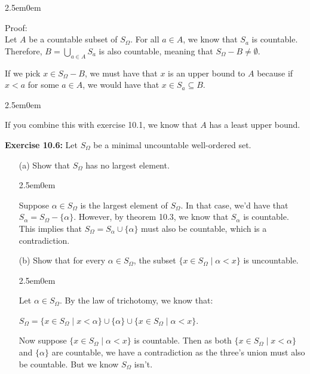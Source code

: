 \documentclass{book}
\newcommand{\hTwo}{%
\color{Black}%
   \fontsize{13}{15}\selectfont%
}
\newcommand{\myComment}{%
   \color{RawerSienna}%
   \fontsize{12}{14}\selectfont%
}
\newcommand{\exOne}{%
   \color{Purple}%
   \fontsize{14}{16}\selectfont%
}
\newcommand{\exTwo}{%
\color{Purple}%
   \fontsize{13}{15}\selectfont%
}
\newenvironment{myIndent}{%
   \begin{adjustwidth}{2.5em}{0em}%
}{%
   \end{adjustwidth}%
}
\newcommand{\blab}[1]{\textbf{#1}}
\newcommand{\retTwo}{\hfill\bigbreak}
\begin{document}
   \begin{myIndent}\hTwo
      Proof:\\
      Let $A$ be a countable subset of $S_\Omega$. For all $a \in A$, we know that $S_a$ is countable. Therefore, $B = \bigcup\limits_{a \in A}S_a$ is also countable, meaning that $S_\Omega - B \neq \emptyset$.\retTwo

      If we pick $x \in S_\Omega - B$, we must have that $x$ is an upper bound to $A$ because if $x < a$ for some $a \in A$, we would have that $x \in S_a \subseteq B$.\retTwo
      
      
      \begin{myIndent}\myComment
         If you combine this with exercise 10.1, we know that $A$ has a least upper bound.\retTwo
      \end{myIndent}
   \end{myIndent}

   \exOne
   \blab{Exercise 10.6:} Let $S_\Omega$ be a minimal uncountable well-ordered set.
   
   \begin{itemize}
      \item[(a)] Show that $S_\Omega$ has no largest element.
      \begin{myIndent}\exTwo
         Suppose $\alpha \in S_\Omega$ is the largest element of $S_\Omega$. In that case, we'd have that\\ $S_\alpha = S_\Omega - \{\alpha\}$. However, by theorem 10.3, we know that $S_\alpha$ is countable. This implies that $S_\Omega = S_\alpha \cup \{\alpha\}$ must also be countable, which is a contradiction.
         \retTwo
      \end{myIndent}
      \item[(b)] Show that for every $\alpha \in S_\Omega$, the subset $\{x \in S_\Omega \mid \alpha < x\}$ is uncountable.
      \begin{myIndent}\exTwo
         Let $\alpha \in S_\Omega$. By the law of trichotomy, we know that:
   
         {\centering $S_\Omega = \{x \in S_\Omega \mid x < \alpha\} \cup \{\alpha\} \cup \{x \in S_\Omega \mid \alpha < x\}$.\retTwo\par}
         
         Now suppose $\{x \in S_\Omega \mid \alpha < x\}$ is countable. Then as both $\{x \in S_\Omega \mid x < \alpha\}$ and $\{\alpha\}$ are countable, we have a contradiction as the three's union must also be countable. But we know $S_\Omega$ isn't.\retTwo
      \end{myIndent}
   \end{itemize}
\end{document}
